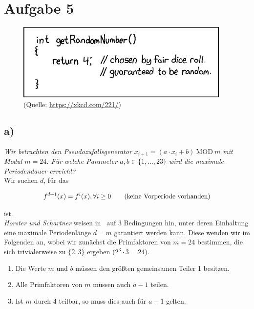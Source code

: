 \chapter{Aufgabe 5}

\begin{figure}
    \centering
    \includegraphics[scale=0.6]{aufgabe 5/img/xkcd221}
    \caption{(Quelle: \url{https://xkcd.com/221/})}
    \label{fig:xkcd221}
\end{figure}

\section{a)}

\textit{Wir betrachten den Pseudozufallsgenerator $x_{i+1} = (a \cdot x_i + b) \ \text{MOD}\ m$ mit Modul
    $m = 24$. Für welche Parameter $a,b \in \{1, \ldots, 23\}$ wird die maximale Periodendauer
    erreicht?}\\

\noindent
Wir suchen $d$, für das

\begin{equation}\notag
f^{d+1}(x) = f^i(x), \forall i \geq 0 \qquad{\text{(keine Vorperiode vorhanden)}}
\end{equation}

\noindent
ist.\\

\noindent
\textit{Horster und Schartner} weisen in~\cite[83]{ITS3} auf 3 Bedingungen hin, unter deren Einhaltung eine maximale Periodenlänge $d = m$ garantiert werden kann.
Diese wenden wir im Folgenden an, wobei wir zunächst die Primfaktoren von $m = 24$ bestimmen, die sich trivialerweise zu $\{2, 3\}$ ergeben ($2^3 \cdot 3 = 24$).

\begin{enumerate}
    \itemsep0.5em
    \item Die Werte $m$ und $b$ müssen den größten gemeinsamen Teiler 1 besitzen.
    \item Alle Primfaktoren von $m$ müssen auch $a - 1$ teilen.
    \item Ist $m$ durch 4 teilbar, so muss dies auch für $a - 1$ gelten.
\end{enumerate}

